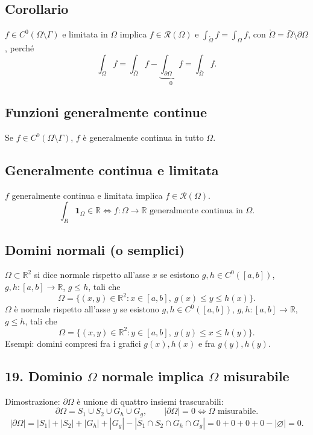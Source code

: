 \documentclass[11pt,a4paper]{article}
\newcommand{\R}{\mathbb R}\newcommand{\N}{\mathbb N}\newcommand{\pagina}[1]{\clearpage}
\begin{document}
\subsection*{Corollario}
$f\in C^0(\Omega\setminus\Gamma)$ e limitata in $\Omega$ implica $f\in\mathcal R(\Omega)$ e $\int_{\mathring\Omega}f=\int_\Omega f$, con $\mathring\Omega=\bar\Omega\setminus\partial\Omega$, perché
\[\int_{\mathring\Omega}f=\int_{\bar\Omega}f-\underbrace{\int_{\partial\Omega}f}_{0}=\int_{\bar\Omega}f.\]
\subsection*{Funzioni generalmente continue}
Se $f\in C^0(\Omega\setminus\Gamma)$, $f$ è generalmente continua in tutto $\Omega$.
\subsection*{Generalmente continua e limitata}
$f$ generalmente continua e limitata implica $f\in\mathcal R(\Omega)$.
\[\int_R\mathbf1_\Omega\in\R\iff f:\Omega\to\R\text{ generalmente continua in }\Omega.\]
\subsection*{Domini normali (o semplici)}
$\Omega\subset\R^2$ si dice normale rispetto all'asse $x$ se esistono $g,h\in C^0([a,b])$, $g,h:[a,b]\to\R$, $g\le h$, tali che
\[\Omega=\{(x,y)\in\R^2:x\in[a,b],\ g(x)\le y\le h(x)\}.\]
$\Omega$ è normale rispetto all'asse $y$ se esistono $g,h\in C^0([a,b])$, $g,h:[a,b]\to\R$, $g\le h$, tali che
\[\Omega=\{(x,y)\in\R^2:y\in[a,b],\ g(y)\le x\le h(y)\}.\]
\pagina{42}
Esempi: domini compresi fra i grafici $g(x),h(x)$ e fra $g(y),h(y)$.
\subsection*{19. Dominio $\Omega$ normale implica $\Omega$ misurabile}
Dimostrazione: $\partial\Omega$ è unione di quattro insiemi trascurabili:
\[\partial\Omega=S_1\cup S_2\cup G_h\cup G_g,\qquad|\partial\Omega|=0\iff\Omega\text{ misurabile}.\]
\[|\partial\Omega|=|S_1|+|S_2|+|G_h|+|G_g|-|S_1\cap S_2\cap G_h\cap G_g|=0+0+0+0-|\varnothing|=0.\]
\end{document}
